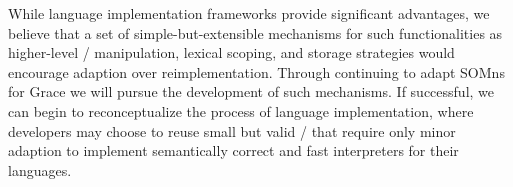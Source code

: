 While language implementation frameworks provide significant advantages, we believe that a set of simple-but-extensible mechanisms for such functionalities as higher-level \AST/ manipulation, lexical scoping, and storage strategies would encourage adaption over reimplementation. Through continuing to adapt SOMns for Grace we will pursue the development of such mechanisms. If successful, we can begin to reconceptualize the process of language implementation, where developers may choose to reuse small but valid \vms/ that require only minor adaption to implement semantically correct and fast interpreters for their languages.

%

